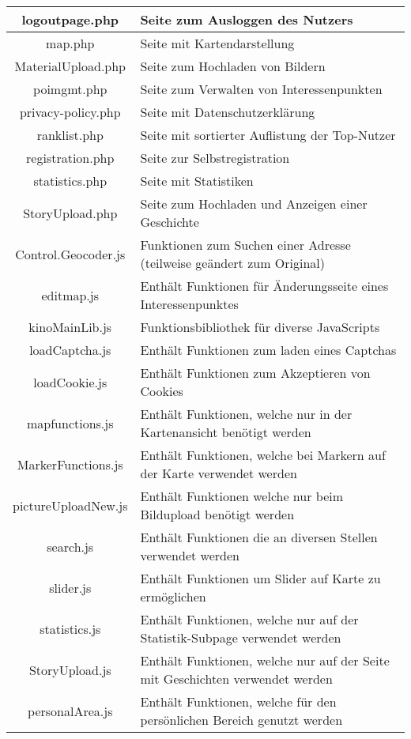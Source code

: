 \begin{longtable}[H]{|c|p{10cm}|}
	logoutpage.php & Seite zum Ausloggen des Nutzers \\ \hline
	map.php & Seite mit Kartendarstellung \\ \hline
	MaterialUpload.php & Seite zum Hochladen von Bildern \\ \hline
	poimgmt.php & Seite zum Verwalten von Interessenpunkten \\ \hline
	privacy-policy.php & Seite mit Datenschutzerklärung \\ \hline
	ranklist.php & Seite mit sortierter Auflistung der Top-Nutzer \\ \hline
	registration.php & Seite zur Selbstregistration \\ \hline
	statistics.php & Seite mit Statistiken \\ \hline
	StoryUpload.php & Seite zum Hochladen und Anzeigen einer Geschichte \\ \hline
	Control.Geocoder.js & Funktionen zum Suchen einer Adresse (teilweise geändert zum Original) \\ \hline
	editmap.js & Enthält Funktionen für Änderungsseite eines Interessenpunktes \\ \hline
	kinoMainLib.js & Funktionsbibliothek für diverse JavaScripts \\ \hline
	loadCaptcha.js & Enthält Funktionen zum laden eines Captchas \\ \hline
	loadCookie.js & Enthält Funktionen zum Akzeptieren von Cookies \\ \hline
	mapfunctions.js & Enthält Funktionen, welche nur in der Kartenansicht benötigt werden \\ \hline
	MarkerFunctions.js & Enthält Funktionen, welche bei Markern auf der Karte verwendet werden \\ \hline
	pictureUploadNew.js & Enthält Funktionen welche nur beim Bildupload benötigt werden \\ \hline
	search.js & Enthält Funktionen die an diversen Stellen verwendet werden \\ \hline
	slider.js & Enthält Funktionen um Slider auf Karte zu ermöglichen \\ \hline
	statistics.js & Enthält Funktionen, welche nur auf der Statistik-Subpage verwendet werden \\ \hline
	StoryUpload.js & Enthält Funktionen, welche nur auf der Seite mit Geschichten verwendet werden \\ \hline
	personalArea.js & Enthält  Funktionen, welche für den persönlichen Bereich genutzt werden\\ \hline

\end{longtable}
